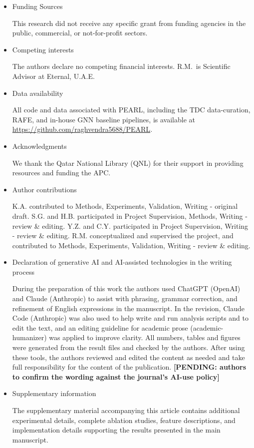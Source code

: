 \documentclass[pdflatex,sn-mathphys-num]{sn-jnl}%
\newcommand{\pending}[1]{{\color{red}\textbf{[PENDING: #1]}}}%
\begin{document}
\begin{itemize}
\item Funding Sources

This research did not receive any specific grant from funding agencies in the public, commercial, or not-for-profit sectors.

\item Competing interests

The authors declare no competing financial interests. R.M.\ is Scientific Advisor at Eternal, U.A.E.

\item Data availability

All code and data associated with PEARL, including the TDC data-curation, RAFE, and in-house GNN baseline pipelines, is available at \url{https://github.com/raghvendra5688/PEARL}.

\item Acknowledgments

We thank the Qatar National Library (QNL) for their support in providing resources and funding the APC.

\item Author contributions

K.A. contributed to Methods, Experiments, Validation, Writing - original draft. S.G. and H.B. participated in Project Supervision, Methods, Writing - review \& editing. Y.Z. and C.Y. participated in Project Supervision, Writing - review \& editing. R.M. conceptualized and supervised the project, and contributed to Methods, Experiments, Validation, Writing - review \& editing.

\item{Declaration of generative AI and AI-assisted technologies in the writing process}

During the preparation of this work the authors used ChatGPT (OpenAI) and Claude (Anthropic) to assist with phrasing, grammar correction, and refinement of English expressions in the manuscript. In the revision, Claude Code (Anthropic) was also used to help write and run analysis scripts and to edit the text, and an editing guideline for academic prose (academic-humanizer) was applied to improve clarity. All numbers, tables and figures were generated from the result files and checked by the authors. After using these tools, the authors reviewed and edited the content as needed and take full responsibility for the content of the publication. \pending{authors to confirm the wording against the journal's AI-use policy}

\item{Supplementary information}

The supplementary material accompanying this article contains additional experimental details, complete ablation studies, feature descriptions, and implementation details supporting the results presented in the main manuscript.

\end{itemize}
\end{document}
